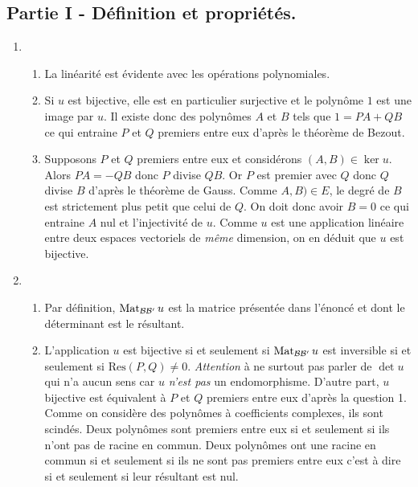 \subsection*{Partie I - Définition et propriétés.}
\begin{enumerate}
 \item
\begin{enumerate}
 \item La linéarité est évidente avec les opérations polynomiales.
 \item Si $u$ est bijective, elle est en particulier surjective et le polynôme $1$ est une image par $u$. Il existe donc des polynômes $A$ et $B$ tels que $1=PA + QB$ ce qui entraine $P$ et $Q$ premiers entre eux d'après le théorème de Bezout.
 \item Supposons $P$ et $Q$ premiers entre eux et considérons $(A,B)\in \ker u$.\newline
Alors $PA = -QB$ donc $P$ divise $QB$. Or $P$ est premier avec $Q$ donc $Q$ divise $B$ d'après le théorème de Gauss. Comme $A,B)\in E$, le degré de $B$ est strictement plus petit que celui de $Q$. On doit donc avoir $B=0$ ce qui entraine $A$ nul et l'injectivité de $u$.\newline
Comme $u$ est une application linéaire entre deux espaces vectoriels de \emph{même} dimension, on en déduit que $u$ est bijective.
\end{enumerate}
 
 \item
\begin{enumerate}
 \item Par définition, $\operatorname{Mat}_{\mathcal{B} \mathcal{B}'}u$ est la matrice présentée dans l'énoncé et dont le déterminant est le résultant.
 \item L'application $u$ est bijective si et seulement si $\operatorname{Mat}_{\mathcal{B} \mathcal{B}'}u$ est inversible si et seulement si $\text{Res}(P,Q)\neq 0$.\newline
\emph{Attention} à ne surtout pas parler de $\det u$ qui n'a aucun sens car $u$ \emph{n'est pas} un endomorphisme.\newline
D'autre part, $u$ bijective est équivalent à $P$ et $Q$ premiers entre eux d'après la question 1. Comme on considère des polynômes à coefficients complexes, ils sont scindés. Deux polynômes sont premiers entre eux si et seulement si ils n'ont pas de racine en commun. Deux polynômes ont une racine en commun si et seulement si ils ne sont pas premiers entre eux c'est à dire si et seulement si leur résultant est nul.
\end{enumerate}


\end{enumerate}
